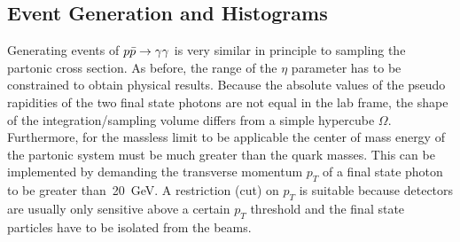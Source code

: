 \subsection{Event Generation and Histograms}%
\label{sec:ppevents}

Generating events of \(p\bar{p}\rightarrow\gamma\gamma\) is very similar in principle to
sampling the partonic cross section. As before, the range of the
\(\eta\) parameter has to be constrained to obtain physical
results. Because the absolute values of the pseudo rapidities of the
two final state photons are not equal in the lab frame, the shape of
the integration/sampling volume differs from a simple hypercube
\(\Omega\). Furthermore, for the massless limit to be applicable the
center of mass energy of the partonic system must be much greater than
the quark masses. This can be implemented by demanding the transverse
momentum \(p_T\) of a final state photon to be greater
than~\SI{20}{\giga\electronvolt}. A restriction (cut) on \(p_T\) is
suitable because detectors are usually only sensitive above a certain
\(p_T\) threshold and the final state particles have to be isolated
from the beams.

